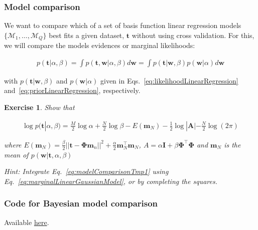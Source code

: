 \documentclass[11pt]{beamer}
\newtheorem{probExercise}{Exercise}
\begin{document}
\begin{frame}
    \frametitle{Model comparison}

    \scriptsize
    We want to compare which of a set of basis function linear regression
    models $\{\mathcal{M}_1,\ldots,\mathcal{M}_Q\}$ best fits a given dataset,
    $\mathbf{t}$ without using cross validation. For this, we will compare the
    models evidences or marginal likelihoods:

    \begin{align}
        p(\mathbf{t}|\alpha,\beta)=\int
        p(\mathbf{t},\mathbf{w}|\alpha,\beta)d\mathbf{w}=\int
        p(\mathbf{t}|\mathbf{w},\beta)p(\mathbf{w}|\alpha)d\mathbf{w}\label{eq:modelComparisonTmp1}
    \end{align}

    with $p(\mathbf{t}|\mathbf{w},\beta)$ and $p(\mathbf{w}|\alpha)$ given in
    Eqs.~\ref{eq:likelihoodLinearRegression}
    and~\ref{eq:priorLinearRegression}, respectively.

    \begin{probExercise}
        Show that

        \begin{align*}
            \log p(\mathbf{t}|\alpha,\beta)=\frac{M}{2}\log\alpha+\frac{N}{2}\log\beta-E(\mathbf{m}_N)-\frac{1}{2}\log|\mathbf{A}|-\frac{N}{2}\log(2\pi)
        \end{align*}

        where
        $E(\mathbf{m}_N)=\frac{\beta}{2}||\mathbf{t}-\boldsymbol{\Phi}\mathbf{m}_n||^2+\frac{\alpha}{2}\mathbf{m}_N^\intercal\mathbf{m}_N$,
        $A=\alpha\mathbf{I}+\beta\boldsymbol{\Phi}^\intercal\boldsymbol{\Phi}$
        and $\mathbf{m}_N$ is the mean of
        $p(\mathbf{w}|\mathbf{t},\alpha,\beta)$

        \vspace{0.5cm}
        Hint: Integrate Eq.~\ref{eq:modelComparisonTmp1} using
        Eq.~\ref{eq:marginalLinearGaussianModel}, or by completing the squares.

        \end{probExercise}
    \normalsize
\end{frame}

\begin{frame}
    \frametitle{Code for Bayesian model comparison}

    Available \href{https://joacorapela.github.io/gcnuBridging2023/auto\_examples/bayesianLinearRegression/plotModelsEvidences.html\#sphx-glr-auto-examples-bayesianlinearregression-plotmodelsevidences-py}{here}.

\end{frame}
\end{document}
